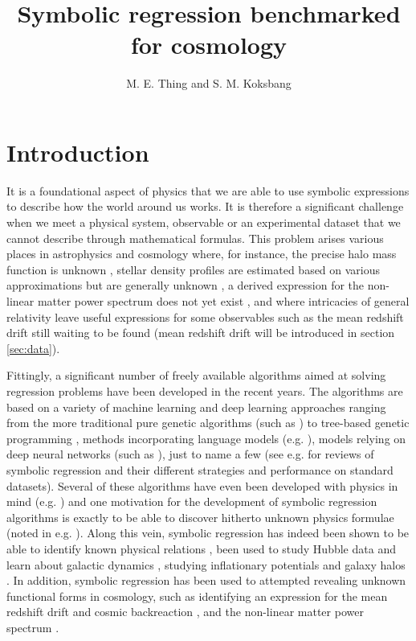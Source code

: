 \documentclass[a4paper,11pt]{article}
\title{Symbolic regression benchmarked for cosmology}
\author{M. E. Thing and S. M. Koksbang}
\affiliation{CP3-Origins, University of Southern Denmark, Campusvej 55, DK-5230 Odense M, Denmark}
\begin{document}
	\maketitle
	\flushbottom
	
\section{Introduction}
	It is a foundational aspect of physics that we are able to use symbolic expressions to describe how the world around us works. It is therefore a significant challenge when we meet a physical system, observable or an experimental dataset that we cannot describe through mathematical formulas. This problem arises various places in astrophysics and cosmology where, for instance, the precise halo mass function is unknown \cite{halo_profile}, stellar density profiles are estimated based on various approximations but are generally unknown \cite{stellar_profile}, a derived expression for the non-linear matter power spectrum does not yet exist \cite{nonlinear_power}, and where intricacies of general relativity leave useful expressions for some observables such as the  mean redshift drift \cite{zdrift1,zdrift2} still waiting to be found (mean redshift drift will be introduced in section \ref{sec:data}).
	
	Fittingly, a significant number of freely available algorithms aimed at solving regression problems have been developed in the recent years. The algorithms are based on a variety of machine learning and deep learning approaches ranging from the more traditional pure genetic algorithms (such as \cite{gplearn}) to tree-based genetic programming \cite{semantic}, methods incorporating language models (e.g. \cite{language}), models relying on deep neural networks (such as \cite{Feynman1, Feynman2}), just to name a few (see e.g. \cite{review, benchmark} for reviews of symbolic regression and their different strategies and performance on standard datasets). Several of these algorithms have even been developed with physics in mind (e.g. \cite{Feynman1, Feynman2, physics_motivation}) and one motivation for the development of symbolic regression algorithms is exactly to be able to discover hitherto unknown physics formulae (noted in e.g. \cite{Feynman1, physics_motivation}). Along this vein, symbolic regression has indeed been shown to be able to identify known physical relations \cite{Feynman1, Feynman2, orbital}, been used to study Hubble data \cite{Hubble, physics_motivation} and learn about galactic dynamics \cite{sparc}, studying inflationary potentials \cite{inflation} and galaxy halos \cite{halo1, halo2}. In addition, symbolic regression has been used to attempted revealing unknown functional forms in cosmology, such as identifying an expression for the mean redshift drift and cosmic backreaction \cite{zdrift1, zdrift2}, and the non-linear matter power spectrum \cite{ps}.
\end{document}
